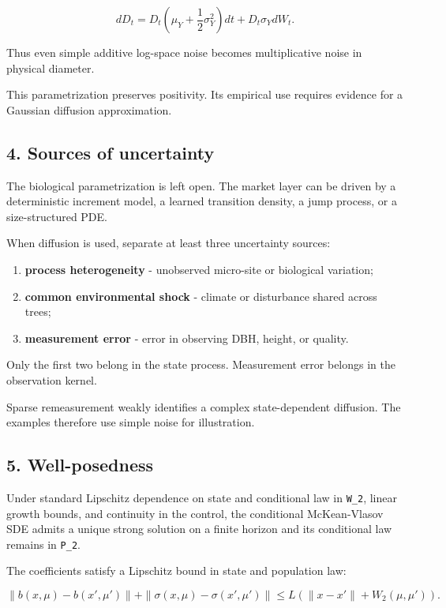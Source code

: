 \[
dD_t=D_t\left(\mu_Y+\frac12\sigma_Y^2\right)dt
+D_t\sigma_YdW_t.
\]

Thus even simple additive log-space noise becomes multiplicative noise in
physical diameter.

This parametrization preserves positivity. Its empirical use requires evidence
for a Gaussian diffusion approximation.

\subsection{4. Sources of uncertainty}\label{sources-of-uncertainty}

The biological parametrization is left open. The market layer can be driven by a
deterministic increment model, a learned
transition density, a jump process, or a size-structured PDE.

When diffusion is used, separate at least three uncertainty sources:

\begin{enumerate}
\def\labelenumi{\arabic{enumi}.}
\tightlist
\item
  \textbf{process heterogeneity} - unobserved micro-site or biological variation;
\item
  \textbf{common environmental shock} - climate or disturbance shared across trees;
\item
  \textbf{measurement error} - error in observing DBH, height, or quality.
\end{enumerate}

Only the first two belong in the state process. Measurement error belongs in the
observation kernel.

Sparse remeasurement weakly identifies a complex state-dependent diffusion. The
examples therefore use simple noise for illustration.

\subsection{5. Well-posedness}\label{well-posedness}

Under standard Lipschitz dependence on state and conditional law in \texttt{W\_2},
linear growth bounds, and continuity in the control, the conditional
McKean-Vlasov SDE admits a unique strong solution on a finite horizon and its
conditional law remains in \texttt{P\_2}.

The coefficients satisfy a Lipschitz bound in state and population law:

\[
\|b(x,\mu)-b(x',\mu')\|
+\|\sigma(x,\mu)-\sigma(x',\mu')\|
\le L(\|x-x'\|+W_2(\mu,\mu')).
\]

